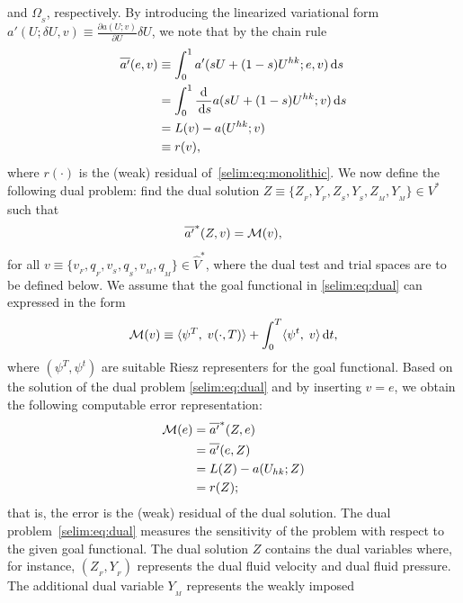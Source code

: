 and $\Omega_{_{S}}$, respectively. By introducing the linearized
variational form $a'(U; \delta U,v ) \equiv \frac{\partial
  a(U;v)}{\partial U}\delta U$, we note that by the chain rule
\begin{equation}
\begin{split}
\overline{a'}(e, v)  &\equiv \int_0^1 a'(sU + (1-s)U^{hk}; e,
v) \, \mathrm{d}s
\\
&= \int_0^1 \frac{\textrm{d}}{\, \mathrm{d}s} a (sU + (1-s)U^{hk}; v) \, \mathrm{d}s
\\
&= L(v) - a(U^{hk};v)
\\ &\equiv  r(v),
\end{split}
\end{equation}
where $r(\cdot)$ is the (weak) residual of~\eqref{selim:eq:monolithic}.
We now define the following dual problem: find the dual solution
$Z\equiv \{ Z_{_{F}}, Y_{_{F}}, Z_{_{S}}, Y_{_{S}}, Z_{_{M}},
Y_{_{M}}\}\in V^*$ such that
\begin{equation}
  \label{selim:eq:dual}
  \overline{a'}^{*}(Z, v) = \mathcal{M}(v),
\end{equation}
for all $v\equiv \{ v_{_{F}}, q_{_{F}}, v_{_{S}}, q_{_{S}}, v_{_{M}}, q_{_{M}}
\}\in\hat{V}^*$, where the dual test and trial spaces are to be
defined below.
We assume that the goal functional in \eqref{selim:eq:dual} can
expressed in the form
\begin{equation}
\mathcal{M}(v)  \equiv \langle \psi^T,\;  v(\cdot, T) \rangle +
\int_0^T \langle \psi^t,\; v \rangle \, \mathrm{d}t,
\end{equation}
where $(\psi^T, \psi^t)$ are suitable Riesz representers for the
goal functional. Based on the solution of the dual
problem \eqref{selim:eq:dual} and by inserting $v=e$,
we obtain the following computable error representation:
\begin{equation}
\label{selim:eq:representation}
\begin{split}
\mathcal{M}(e) &= \overline{a'}^{*}(Z ,e)
\\
    &= \overline{a'}(e, Z)
\\
  &= L(Z) - a(U_{hk}; Z)
\\
  &= r(Z);
\end{split}
\end{equation}
that is, the error is the (weak) residual of the dual solution.  The
dual problem~\eqref{selim:eq:dual} measures the sensitivity of the
problem with respect to the given goal functional. The dual solution
$Z$ contains the dual variables where, for instance, $(Z_{_{F}},
Y_{_{F}})$ represents the dual fluid velocity and dual fluid pressure.
The additional dual variable $Y_{_{M}}$ represents the weakly imposed
